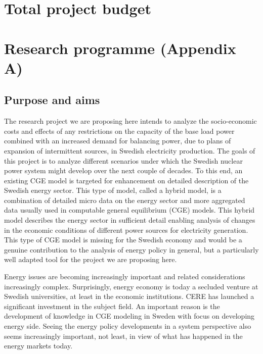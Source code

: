 \documentclass[10pt,a4paper]{article}
\begin{document}
\section{Total project budget}
\section{Research programme (Appendix A)}
\subsection{Purpose and aims}
The research project we are proposing here intends to analyze the socio-economic costs and effects of any restrictions on the capacity of the base load power combined with an increased demand for balancing power, due to plans of expansion of intermittent sources, in Swedish electricity production. The goals of this project is to analyze different scenarios under which the Swedish nuclear power system might develop over the next couple of decades. To this end, an existing CGE model is targeted for enhancement on detailed description of the Swedish energy sector. This type of model, called a hybrid model, is a combination of detailed micro data on the energy sector and more aggregated data usually used in computable general equilibrium (CGE) models. This hybrid model describes the energy sector in sufficient detail enabling analysis of changes in the economic conditions of different power sources for electricity generation. This type of CGE model is missing for the Swedish economy and would be a genuine contribution to the analysis of energy policy in general, but a particularly well adapted tool for the project we are proposing here.

Energy issues are becoming increasingly important and related considerations increasingly complex. Surprisingly, energy economy is today a secluded venture at Swedish universities, at least in the economic institutions. CERE has launched a significant investment in the subject field. An important reason is the development of knowledge in CGE modeling in Sweden with focus on developing energy side. Seeing the energy policy developments in a system perspective also seems increasingly important, not least, in view of what has happened in the energy markets today.
\end{document}
